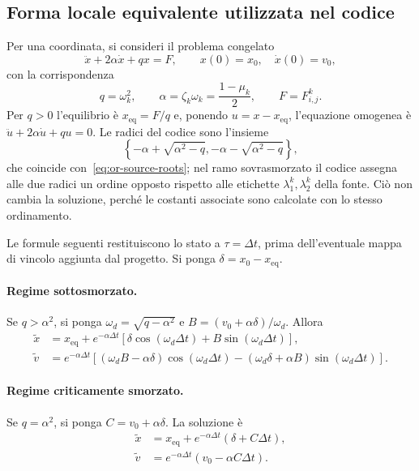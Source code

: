 \subsection{Forma locale equivalente utilizzata nel codice}

Per una coordinata, si consideri il problema congelato
\begin{equation}
 \ddot x+2\alpha\dot x+q x=F,
 \qquad x(0)=x_0,\quad \dot x(0)=v_0,
 \label{eq:app-ode}
\end{equation}
con la corrispondenza
\begin{equation}
 q=\omega_k^2,
 \qquad \alpha=\zeta_k\omega_k=\frac{1-\mu_k}{2},
 \qquad F=F_{i,j}^k.
 \label{eq:app-code-map}
\end{equation}
Per $q>0$ l'equilibrio è $x_{\mathrm{eq}}=F/q$ e, ponendo $u=x-x_{\mathrm{eq}}$, l'equazione omogenea è $\ddot u+2\alpha\dot u+q u=0$. Le radici del codice sono l'insieme
\begin{equation}
 \left\{-\alpha+\sqrt{\alpha^2-q},
       -\alpha-\sqrt{\alpha^2-q}\right\},
 \label{eq:app-code-roots}
\end{equation}
che coincide con~\eqref{eq:or-source-roots}; nel ramo sovrasmorzato il codice assegna alle due radici un ordine opposto rispetto alle etichette $\lambda_1^k,\lambda_2^k$ della fonte. Ciò non cambia la soluzione, perché le costanti associate sono calcolate con lo stesso ordinamento.

Le formule seguenti restituiscono lo stato a $\tau=\Delta t$, prima dell'eventuale mappa di vincolo aggiunta dal progetto. Si ponga $\delta=x_0-x_{\mathrm{eq}}$.

\paragraph{Regime sottosmorzato.}
Se $q>\alpha^2$, si ponga $\omega_d=\sqrt{q-\alpha^2}$ e $B=(v_0+\alpha\delta)/\omega_d$. Allora
\begin{align}
 \widetilde x&=x_{\mathrm{eq}}+e^{-\alpha\Delta t}
 \left[\delta\cos(\omega_d\Delta t)+B\sin(\omega_d\Delta t)\right],
 \label{eq:app-under-x}\\
 \widetilde v&=e^{-\alpha\Delta t}\left[
 (\omega_dB-\alpha\delta)\cos(\omega_d\Delta t)
 -(\omega_d\delta+\alpha B)\sin(\omega_d\Delta t)
 \right].
 \label{eq:app-under-v}
\end{align}

\paragraph{Regime criticamente smorzato.}
Se $q=\alpha^2$, si ponga $C=v_0+\alpha\delta$. La soluzione è
\begin{align}
 \widetilde x&=x_{\mathrm{eq}}+e^{-\alpha\Delta t}
 (\delta+C\Delta t),
 \label{eq:app-critical-x}\\
 \widetilde v&=e^{-\alpha\Delta t}
 (v_0-\alpha C\Delta t).
 \label{eq:app-critical-v}
\end{align}

